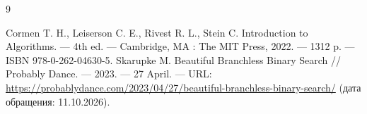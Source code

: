\renewcommand{\bibname}{СПИСОК ИСПОЛЬЗОВАННЫХ ИСТОЧНИКОВ}
\begin{thebibliography}{9}
 Cormen T. H., Leiserson C. E., Rivest R. L., Stein C. Introduction to Algorithms. --- 4th ed. --- Cambridge, MA : The MIT Press, 2022. --- 1312 p. --- ISBN 978-0-262-04630-5.
 Skarupke M. Beautiful Branchless Binary Search // Probably Dance. --- 2023. --- 27 April. --- URL: \url{https://probablydance.com/2023/04/27/beautiful-branchless-binary-search/} (дата обращения: 11.10.2026).
\end{thebibliography}
